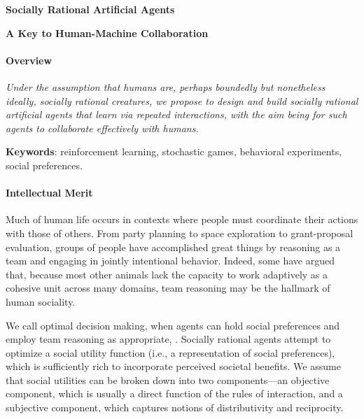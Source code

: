 
\centerline{\Large \bf Socially Rational Artificial Agents}

\vspace{\down}
\centerline{\large \bf A Key to Human-Machine Collaboration}

\vspace{\up}
\paragraph{Overview}

\emph{Under the assumption that humans are, perhaps boundedly
  but nonetheless ideally, socially rational creatures, we propose to
  design and build socially rational artificial agents that learn via
  repeated interactions, with the aim being for such agents to
  collaborate effectively with humans.}



{\bf Keywords}: reinforcement learning, stochastic games, behavioral experiments, social preferences.

\vspace{\up}
\paragraph{Intellectual Merit}

Much of human life occurs in contexts where people must coordinate
their actions with those of others.  From party planning to space
exploration to grant-proposal evaluation, groups of people have
accomplished great things by reasoning as a team and engaging in
jointly intentional behavior.  Indeed, some have argued that, because
most other animals lack the capacity to work adaptively as a cohesive
unit across many domains, team reasoning may be the hallmark of human
sociality.

We call optimal decision making, when agents can hold social
preferences and employ team reasoning as appropriate, .  Socially rational agents attempt to optimize a
social utility function (i.e., a representation of social
preferences), which is sufficiently rich to incorporate perceived
societal benefits.  We assume that social utilities can be broken down
into two components---an objective component, which is usually a
direct function of the rules of interaction, and a subjective
component, which captures notions of distributivity and reciprocity.

